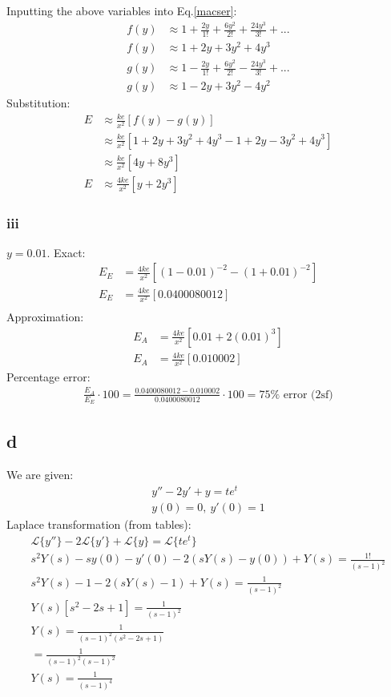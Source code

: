 \documentclass[11pt]{article}
\numberwithin{equation}{section}
\begin{document}
Inputting the above variables into Eq.\ref{macser}:
\begin{align}
	f(y) &\approx 1 + \frac{2 y}{1!} + \frac{6y^2}{2!} + \frac{24y^3}{3!} + ...\\
	f(y) &\approx 1 + 2y + 3y^2 + 4y^3 \\ 
	g(y) &\approx 1 - \frac{2 y}{1!} + \frac{6y^2}{2!} - \frac{24y^3}{3!} + ...\\
	g(y) &\approx 1 - 2y + 3y^2 - 4y^2
\end{align}
Substitution:
\begin{align}
	E &\approx \frac{ke}{x^2} \left[ f(y) - g(y)\right]\\
	&\approx \frac{ke}{x^2} \left[ 1 + 2y + 3y^2 + 4y^3 - 1 + 2y - 3y^2 + 4y^3 \right]\\
	&\approx \frac{ke}{x^2}\left[ 4y + 8y^3 \right]\\
	E &\approx \frac{4ke}{x^2}\left[ y + 2y^3 \right]
\end{align}
\subsubsection*{iii}
$y = 0.01$. Exact:
\begin{align}
	E_E &= \frac{4ke}{x^2} \left[\left(1-0.01\right)^{-2}-\left(1+0.01\right)^{-2}\right]\\
	E_E &= \frac{4ke}{x^2} \left[0.0400080012\right]\\
\end{align}
Approximation:
\begin{align}
	E_A &= \frac{4ke}{x^2} \left[0.01 + 2\left(0.01\right)^3\right]\\
	E_A &= \frac{4ke}{x^2} \left[0.010002\right]
\end{align}
Percentage error:
\begin{align}
	\frac{E_A}{E_E} \cdot 100 = \frac{0.0400080012 - 0.010002}{0.0400080012} \cdot 100 = 75\% \textrm{ error (2sf)}
\end{align}
\subsection*{d}
We are given:
\begin{align}
	y'' - 2y' + y = te^t\\
	y(0) = 0, \ y'(0)=1
\end{align}
Laplace transformation (from tables):
\begin{gather}
	\mathcal{L} \{ y''\} - 2\mathcal{L} \{ y'\} + \mathcal{L} \{ y\} = \mathcal{L} \{te^t \}\\
	s^2 Y(s) - sy(0) - y'(0) - 2\left(sY(s) - y(0)\right) + Y(s) = \frac{1!}{\left(s-1\right)^2}\\
	s^2 Y(s) -1 -2(sY(s) - 1) + Y(s) = \frac{1}{\left(s-1\right)^2}\\
	Y(s)\left[s^2-2s+1\right] = \frac{1}{\left(s-1\right)^2}\\
	Y(s) = \frac{1}{\left(s-1\right)^2\left(s^2-2s+1\right)}\\
	= \frac{1}{\left(s-1\right)^2\left(s-1\right)^2}\\
	Y(s) = \frac{1}{\left(s-1\right)^4} 
\end{gather}
\end{document}
